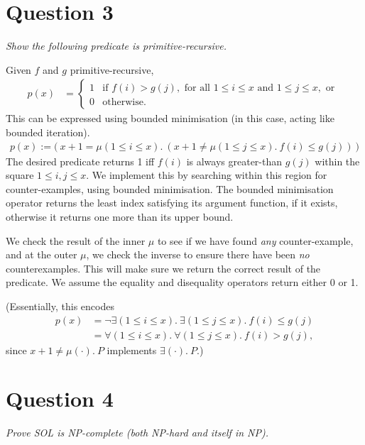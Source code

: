 \documentclass[a4paper]{article}
\begin{document}
\section*{Question 3}
\begin{center}
  \textit{Show the following predicate is primitive-recursive.}
\end{center}
Given $f$ and $g$ primitive-recursive,
\begin{align*}
  p(x) &= \begin{cases}
    1 & \text{if } f(i) > g(j),\text{ for all } 1 \le i \le x \text{ and } 1 \le j \le x,\text{ or } \\
    0 & \text{otherwise.}
  \end{cases}
\end{align*}
This can be expressed using bounded minimisation
(in this case, acting like bounded iteration).
\begin{align*}
  p(x) := \big(~x+1 = \mu(1\le i \le x).~(x+1 \ne \mu(1\le j \le x).~f(i) \le g(j))~\big)
\end{align*}
The desired predicate returns 1 iff $f(i)$ is always
greater-than $g(j)$ within
the square $1 \le i,j \le x$.
We implement this by searching within this region for counter-examples,
using bounded minimisation.
The bounded minimisation operator returns the least index satisfying its
argument function, if it exists, otherwise it returns one more than its upper bound.

We check the result of the inner $\mu$ to see if we have found \textit{any} counter-example,
and at the outer $\mu$, we check the inverse to ensure there have been \textit{no} counterexamples.
This will make sure we return the correct result of the predicate.
We assume the equality and disequality operators return either 0 or 1.

(Essentially, this encodes
\begin{align*}
  p(x) &= \neg \exists(1 \le i \le x).~\exists(1 \le j \le x).~f(i) \le g(j) \\
       &= \forall(1 \le i \le x).~\forall(1 \le j \le x).~f(i) > g(j),
\end{align*}
since $x + 1 \ne \mu(\cdot).~P$ implements $\exists(\cdot).~P$.)

\section*{Question 4}
\begin{center}
  \textit{
  Prove \textit{SOL} is NP-complete (both NP-hard and itself in NP).}
\end{center}
\end{document}
